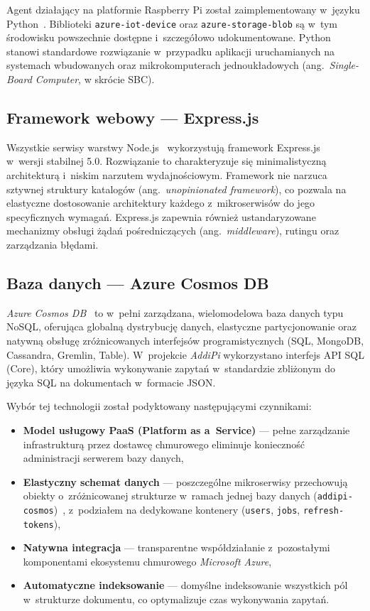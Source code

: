 \documentclass[a4paper,12pt,reqno]{article}
\begin{document}
Agent działający na platformie Raspberry Pi został zaimplementowany w~języku Python~\cite{python}. Biblioteki \texttt{azure-iot-device} oraz \texttt{azure-storage-blob} są w~tym środowisku powszechnie dostępne i~szczegółowo udokumentowane. Python stanowi standardowe rozwiązanie w~przypadku aplikacji uruchamianych na systemach wbudowanych oraz mikrokomputerach jednoukładowych (ang.~\textit{Single-Board Computer}, w skrócie SBC).

\subsection{Framework webowy --- Express.js}

Wszystkie serwisy warstwy Node.js~\cite{nodejs} wykorzystują framework Express.js~\cite{express} w~wersji stabilnej 5.0. Rozwiązanie to charakteryzuje się minimalistyczną architekturą i~niskim narzutem wydajnościowym. Framework nie narzuca sztywnej struktury katalogów (ang.~\textit{unopinionated framework}), co pozwala na elastyczne dostosowanie architektury każdego z~mikroserwisów do jego specyficznych wymagań. Express.js zapewnia również ustandaryzowane mechanizmy obsługi żądań pośredniczących (ang.~\textit{middleware}), rutingu oraz zarządzania błędami.

\subsection{Baza danych --- Azure Cosmos DB}

\textit{Azure Cosmos DB}~\cite{cosmosdb} to w~pełni zarządzana, wielomodelowa baza danych typu NoSQL, oferująca globalną dystrybucję danych, elastyczne partycjonowanie oraz natywną obsługę zróżnicowanych interfejsów programistycznych (SQL, MongoDB, Cassandra, Gremlin, Table). W~projekcie \textit{AddiPi} wykorzystano interfejs API SQL (Core), który umożliwia wykonywanie zapytań w~standardzie zbliżonym do języka SQL na dokumentach w~formacie JSON.

Wybór tej technologii został podyktowany następującymi czynnikami:
\begin{itemize}
	\item \textbf{Model usługowy PaaS (Platform as a~Service)} --- pełne zarządzanie infrastrukturą przez dostawcę chmurowego eliminuje konieczność administracji serwerem bazy danych,
	\item \textbf{Elastyczny schemat danych} --- poszczególne mikroserwisy przechowują obiekty o~zróżnicowanej strukturze w~ramach jednej bazy danych (\texttt{addipi-cosmos})~\cite{kleppmann2017}, z~podziałem na dedykowane kontenery (\texttt{users}, \texttt{jobs}, \texttt{refresh-tokens}),
	\item \textbf{Natywna integracja} --- transparentne współdziałanie z~pozostałymi komponentami ekosystemu chmurowego \textit{Microsoft Azure},
	\item \textbf{Automatyczne indeksowanie} --- domyślne indeksowanie wszystkich pól w~strukturze dokumentu, co optymalizuje czas wykonywania zapytań.
\end{itemize}
\end{document}
